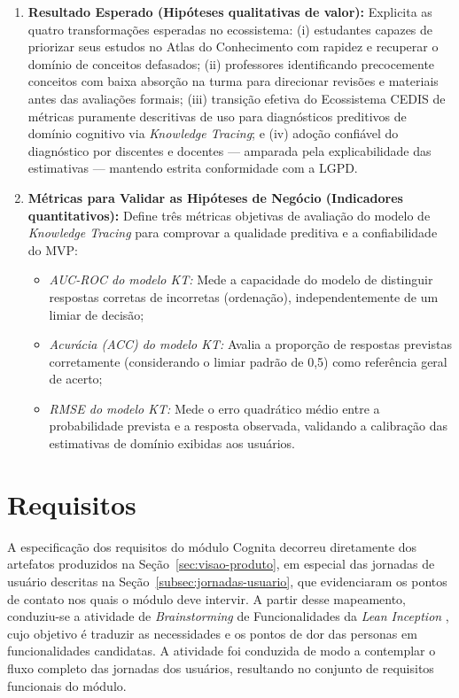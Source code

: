 \begin{enumerate}
    \item \textbf{Resultado Esperado (Hipóteses qualitativas de valor):} Explicita as quatro transformações esperadas no ecossistema: (i) estudantes capazes de priorizar seus estudos no Atlas do Conhecimento com rapidez e recuperar o domínio de conceitos defasados; (ii) professores identificando precocemente conceitos com baixa absorção na turma para direcionar revisões e materiais antes das avaliações formais; (iii) transição efetiva do Ecossistema CEDIS de métricas puramente descritivas de uso para diagnósticos preditivos de domínio cognitivo via \textit{Knowledge Tracing}; e (iv) adoção confiável do diagnóstico por discentes e docentes — amparada pela explicabilidade das estimativas — mantendo estrita conformidade com a LGPD.

    \item \textbf{Métricas para Validar as Hipóteses de Negócio (Indicadores quantitativos):} Define três métricas objetivas de avaliação do modelo de \textit{Knowledge Tracing} para comprovar a qualidade preditiva e a confiabilidade do MVP:
    \begin{itemize}
        \item \textit{AUC-ROC do modelo KT:} Mede a capacidade do modelo de distinguir respostas corretas de incorretas (ordenação), independentemente de um limiar de decisão;
        \item \textit{Acurácia (ACC) do modelo KT:} Avalia a proporção de respostas previstas corretamente (considerando o limiar padrão de 0,5) como referência geral de acerto;
        \item \textit{RMSE do modelo KT:} Mede o erro quadrático médio entre a probabilidade prevista e a resposta observada, validando a calibração das estimativas de domínio exibidas aos usuários.
    \end{itemize}
\end{enumerate}


\section{Requisitos}
\label{sec:requisitos}

A especificação dos requisitos do módulo Cognita decorreu diretamente dos artefatos produzidos na Seção~\ref{sec:visao-produto}, em especial das jornadas de usuário descritas na Seção~\ref{subsec:jornadas-usuario}, que evidenciaram os pontos de contato nos quais o módulo deve intervir. A partir desse mapeamento, conduziu-se a atividade de \textit{Brainstorming} de Funcionalidades da \textit{Lean Inception} \cite{caroli_lean_2018}, cujo objetivo é traduzir as necessidades e os pontos de dor das personas em funcionalidades candidatas. A atividade foi conduzida de modo a contemplar o fluxo completo das jornadas dos usuários, resultando no conjunto de requisitos funcionais do módulo.

